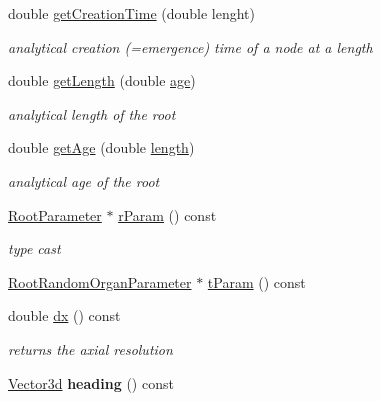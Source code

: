 \begin{DoxyCompactItemize}
double \hyperlink{classCPlantBox_1_1Root_a80123f9e090ef2b04686d488418d3466}{get\+Creation\+Time} (double lenght)
\begin{DoxyCompactList}\small\item\em analytical creation (=emergence) time of a node at a length \end{DoxyCompactList}\item 
double \hyperlink{classCPlantBox_1_1Root_a3501e66ef57a4ecc04fb2130a9d5aa17}{get\+Length} (double \hyperlink{classCPlantBox_1_1Organ_a4f17f0bfe7f03eedf4138fd8fe51376d}{age})
\begin{DoxyCompactList}\small\item\em analytical length of the root \end{DoxyCompactList}\item 
double \hyperlink{classCPlantBox_1_1Root_af9d9bff1f62c49b6d472584c0969fbb1}{get\+Age} (double \hyperlink{classCPlantBox_1_1Organ_a94f5b16aa7ebc3912501051281fe88dc}{length})
\begin{DoxyCompactList}\small\item\em analytical age of the root \end{DoxyCompactList}\item 
\mbox{\label{classCPlantBox_1_1Root_a195c7b712cf32e6593eafb9ca1f69c2a}} 
\hyperlink{classCPlantBox_1_1RootParameter}{Root\+Parameter} $\ast$ \hyperlink{classCPlantBox_1_1Root_a195c7b712cf32e6593eafb9ca1f69c2a}{r\+Param} () const
\begin{DoxyCompactList}\small\item\em type cast \end{DoxyCompactList}\item 
\hyperlink{classCPlantBox_1_1RootRandomOrganParameter}{Root\+Random\+Organ\+Parameter} $\ast$ \hyperlink{classCPlantBox_1_1Root_aeb5347a24006bd11fd6917a8ade87694}{t\+Param} () const
\item 
double \hyperlink{classCPlantBox_1_1Root_ae81c1b69f5d3cef73b957d887b531ebc}{dx} () const
\begin{DoxyCompactList}\small\item\em returns the axial resolution \end{DoxyCompactList}\item 
\mbox{\label{classCPlantBox_1_1Root_a6b007090bde2be93fdedb4c76b6f171a}} 
\hyperlink{classCPlantBox_1_1Vector3d}{Vector3d} {\bfseries heading} () const
\item 

\end{DoxyCompactItemize}
